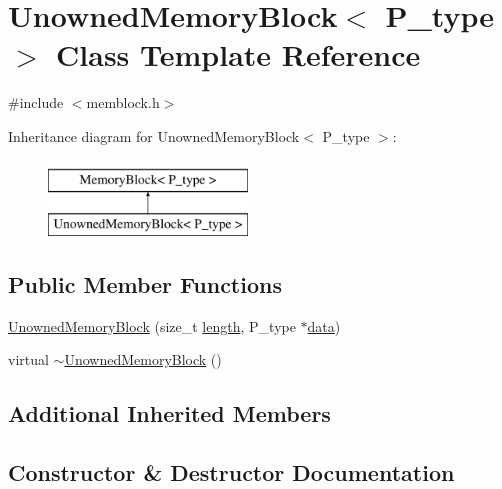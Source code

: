 \hypertarget{classUnownedMemoryBlock}{}\section{Unowned\+Memory\+Block$<$ P\+\_\+type $>$ Class Template Reference}
\label{classUnownedMemoryBlock}


{\ttfamily \#include $<$memblock.\+h$>$}

Inheritance diagram for Unowned\+Memory\+Block$<$ P\+\_\+type $>$\+:\begin{figure}[H]
\begin{center}
\leavevmode
\includegraphics[height=2.000000cm]{classUnownedMemoryBlock}
\end{center}
\end{figure}
\subsection*{Public Member Functions}
\begin{DoxyCompactItemize}
\item 
\hyperlink{classUnownedMemoryBlock_a856b4cbfcb535b18fa6ef743b332004b}{Unowned\+Memory\+Block} (size\+\_\+t \hyperlink{classMemoryBlock_a8f84962332d0ad33d004e291ac3797c4}{length}, P\+\_\+type $\ast$\hyperlink{classMemoryBlock_a6cb6c999416b3dab1b120156fce2a1ee}{data})
\item 
virtual \hyperlink{classUnownedMemoryBlock_a191b0980f5a18a8b3601356db637f557}{$\sim$\+Unowned\+Memory\+Block} ()
\end{DoxyCompactItemize}
\subsection*{Additional Inherited Members}


\subsection{Constructor \& Destructor Documentation}
\hypertarget{classUnownedMemoryBlock_a856b4cbfcb535b18fa6ef743b332004b}{}

